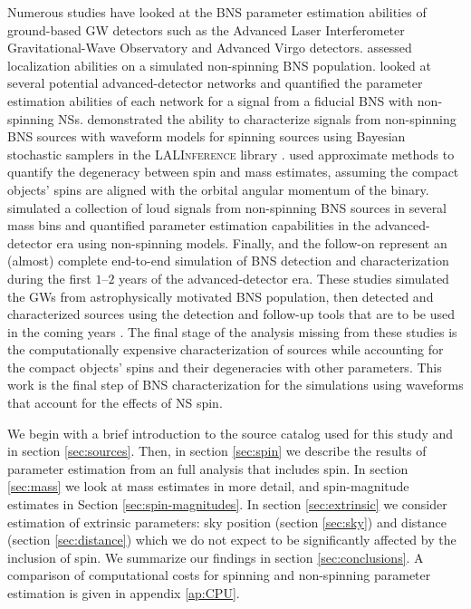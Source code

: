Numerous studies have looked at the BNS parameter estimation abilities of ground-based GW detectors such as the Advanced Laser Interferometer Gravitational-Wave Observatory \citep[aLIGO;][]{Aasi_2015} and Advanced Virgo \citep[AdV;][]{Acernese_2014} detectors. \citet{Nissanke_2010,Nissanke_2011} assessed localization abilities on a simulated non-spinning BNS population. \citet{Veitch_2012} looked at several potential advanced-detector networks and quantified the parameter estimation abilities of each network for a signal from a fiducial BNS with non-spinning NSs. \citet{Aasi_2013} demonstrated the ability to characterize signals from non-spinning BNS sources with waveform models for spinning sources using Bayesian stochastic samplers in the \textsc{LALInference} library \citep{Veitch_2014}.  \citet{Hannam_2013} used approximate methods to quantify the degeneracy between spin and mass estimates, assuming the compact objects' spins are aligned with the orbital angular momentum of the binary. \citet{Rodriguez_2014} simulated a collection of loud signals from non-spinning BNS sources in several mass bins and quantified parameter estimation capabilities in the advanced-detector era using non-spinning models.  Finally, \citet{Singer_2014} and the follow-on \citet{Berry_2014} represent an (almost) complete end-to-end simulation of BNS detection and characterization during the first $1$--$2$ years of the advanced-detector era. These studies simulated the GWs from astrophysically motivated BNS population, then detected and characterized sources using the detection and follow-up tools that are to be used in the coming years \citep{WhitePaper}.   The final stage of the analysis missing from these studies is the computationally expensive characterization of sources while accounting for the compact objects' spins and their degeneracies with other parameters.  This work is the final step of BNS characterization for the \citet{Singer_2014} simulations using waveforms that account for the effects of NS spin.

We begin with a brief introduction to the source catalog used for this study and \citet{Singer_2014} in section \ref{sec:sources}. Then, in section \ref{sec:spin} we describe the results of parameter estimation from an full analysis that includes spin. In section \ref{sec:mass} we look at mass estimates in more detail, and spin-magnitude estimates in Section \ref{sec:spin-magnitudes}. In section \ref{sec:extrinsic} we consider estimation of extrinsic parameters: sky position (section \ref{sec:sky}) and distance (section \ref{sec:distance}) which we do not expect to be significantly affected by the inclusion of spin. We summarize our findings in section \ref{sec:conclusions}. A comparison of computational costs for spinning and non-spinning parameter estimation is given in appendix \ref{ap:CPU}.

  
  
  
  
  
  